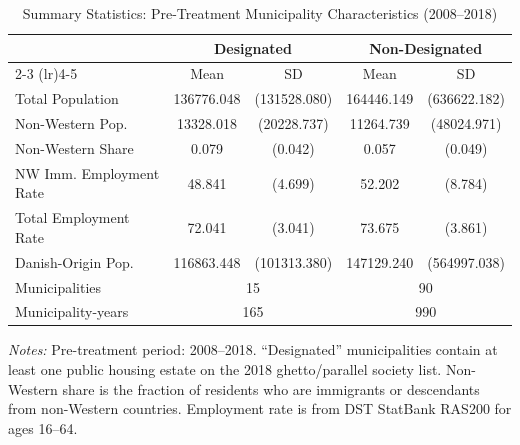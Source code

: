 \begin{table}[htbp]
\centering
\caption{Summary Statistics: Pre-Treatment Municipality Characteristics (2008--2018)}
\label{tab:sumstats}
\begin{tabular}{lcccc}
\hline\hline
 & \multicolumn{2}{c}{Designated} & \multicolumn{2}{c}{Non-Designated} \\
\cmidrule(lr){2-3} \cmidrule(lr){4-5}
 & Mean & SD & Mean & SD \\
\hline
Total Population & 136776.048 & (131528.080) & 164446.149 & (636622.182) \\
Non-Western Pop. & 13328.018 & (20228.737) & 11264.739 & (48024.971) \\
Non-Western Share & 0.079 & (0.042) & 0.057 & (0.049) \\
NW Imm. Employment Rate & 48.841 & (4.699) & 52.202 & (8.784) \\
Total Employment Rate & 72.041 & (3.041) & 73.675 & (3.861) \\
Danish-Origin Pop. & 116863.448 & (101313.380) & 147129.240 & (564997.038) \\
\hline
Municipalities & \multicolumn{2}{c}{15} & \multicolumn{2}{c}{90} \\
Municipality-years & \multicolumn{2}{c}{165} & \multicolumn{2}{c}{990} \\
\hline\hline
\end{tabular}
\begin{tablenotes}[flushleft]
\small
\item \textit{Notes:} Pre-treatment period: 2008--2018. ``Designated'' municipalities contain at least one public housing estate on the 2018 ghetto/parallel society list. Non-Western share is the fraction of residents who are immigrants or descendants from non-Western countries. Employment rate is from DST StatBank RAS200 for ages 16--64.
\end{tablenotes}
\end{table}
